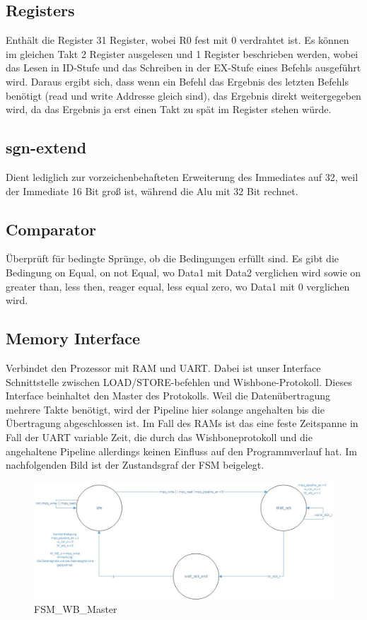 \documentclass[11pt]{article} %
\begin{document}
\subsection{Registers}
Enthält die Register 31 Register, wobei R0 fest mit 0 verdrahtet ist. Es können im gleichen Takt 2 Register ausgelesen und 1 Register beschrieben werden, wobei das Lesen in ID-Stufe und das Schreiben in der EX-Stufe eines Befehls ausgeführt wird. Daraus ergibt sich, dass wenn ein Befehl das Ergebnis des letzten Befehls benötigt (read und write Addresse gleich sind), das Ergebnis direkt weitergegeben wird, da das Ergebnis ja erst einen Takt zu spät im Register stehen würde.

\subsection{sgn-extend}
Dient lediglich zur vorzeichenbehafteten Erweiterung des Immediates auf 32, weil der Immediate 16 Bit groß ist, während die Alu mit 32 Bit rechnet.

\subsection{Comparator}
Überprüft für bedingte Sprünge, ob die Bedingungen erfüllt sind. Es gibt die Bedingung on Equal, on not Equal, wo Data1 mit Data2 verglichen wird  sowie on greater than, less then, reager equal, less equal zero, wo Data1 mit 0 verglichen wird.

\subsection{Memory Interface}
Verbindet den Prozessor mit RAM und UART. Dabei ist unser Interface Schnittstelle zwischen LOAD/STORE-befehlen und Wishbone-Protokoll. Dieses Interface beinhaltet den Master des Protokolls. Weil die Datenübertragung mehrere Takte benötigt, wird der Pipeline hier solange angehalten bis die Übertragung abgeschlossen ist. Im Fall des RAMs ist das eine feste Zeitspanne in Fall der UART variable Zeit, die durch das Wishboneprotokoll und die angehaltene Pipeline allerdings keinen Einfluss auf den Programmverlauf hat. 
Im nachfolgenden Bild ist der Zustandsgraf der FSM beigelegt.

\begin{figure}[h!]
\centering
\includegraphics[width=1\textwidth]{FSM_WBmaster}
\caption{FSM\_WB\_Master}
\end{figure}
\end{document}
